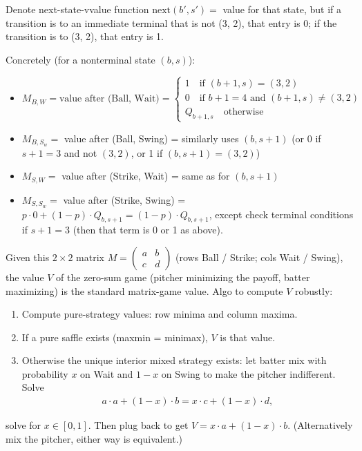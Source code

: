 \documentclass[10pt]{article}
\begin{document}
Denote next-state-vvalue function $\text{next}(b', s') = $ value for that state, but if a transition is to an immediate terminal that is not (3, 2), that entry is 0; if the transition is to (3, 2), that entry is 1.

Concretely (for a nonterminal state $(b, s)$):
\begin{itemize}
    \item \[
M_{B, W} = \text{value after (Ball, Wait)} = 
\begin{cases}
    1\quad\text{if }(b + 1, s) = (3, 2)\\
    0\quad\text{if }b + 1 = 4 \text{ and } (b + 1, s) \neq (3, 2)\\
    Q_{b + 1, s}\quad\text{otherwise}
\end{cases}
\]
    \item $M_{B, S_w} = $ value after (Ball, Swing) = similarly uses $(b, s + 1)$ (or 0 if $s + 1 = 3 $ and not $(3, 2)$, or 1 if $(b, s + 1) = (3, 2)$)
    \item $M_{S, W} = $ value after (Strike, Wait) = same as for $(b, s + 1)$
    \item $M_{S, S_w} = $ value after (Strike, Swing) = $p\cdot 0 + (1 - p)\cdot Q_{b, s + 1} = (1 - p)\cdot Q_{b, s + 1}$, except check terminal conditions if $s + 1 = 3 $ (then that term is 0 or 1 as above).
\end{itemize}
Given this $2\times 2 $ matrix $M = \begin{pmatrix}
    a & b \\
    c & d
\end{pmatrix}$ (rows Ball / Strike; cols Wait / Swing), the value $V $ of the zero-sum game (pitcher minimizing the payoff, batter maximizing) is the standard matrix-game value. Algo to compute $V $ robustly: 

\newpage 

\begin{enumerate}
    \item Compute pure-strategy values: row minima and column maxima.
    \item If a pure saffle exists (maxmin = minimax), $V $ is that value.
    \item Otherwise the unique interior mixed strategy exists: let batter mix with probability $x $ on Wait and $1 - x $ on Swing to make the pitcher indifferent. Solve
    \begin{gather*}
        a \cdot a + (1 - x) \cdot b = x \cdot c + (1 - x) \cdot d,
    \end{gather*}
\end{enumerate}
solve for $x\in [0, 1]$. Then plug back to get $V = x\cdot a + (1 - x)\cdot b $. (Alternatively mix the pitcher, either way is equivalent.)
\end{document}
